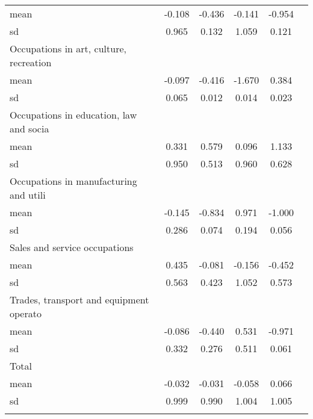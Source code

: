 \begin{tabular*}{\hsize}{ @{\extracolsep{\fill}}l*{5}{c}}
mean                                              &-0.108&-0.436&-0.141&-0.954\\
sd                                                &0.965&0.132&1.059&0.121\\
\hspace{0.25cm}Occupations in art, culture, recreation           &    &    &    &    \\
mean                                              &-0.097&-0.416&-1.670&0.384\\
sd                                                &0.065&0.012&0.014&0.023\\
\hspace{0.25cm}Occupations in education, law and socia           &    &    &    &    \\
mean                                              &0.331&0.579&0.096&1.133\\
sd                                                &0.950&0.513&0.960&0.628\\
\hspace{0.25cm}Occupations in manufacturing and utili            &    &    &    &    \\
mean                                              &-0.145&-0.834&0.971&-1.000\\
sd                                                &0.286&0.074&0.194&0.056\\
\hspace{0.25cm}Sales and service occupations                     &    &    &    &    \\
mean                                              &0.435&-0.081&-0.156&-0.452\\
sd                                                &0.563&0.423&1.052&0.573\\
\hspace{0.25cm}Trades, transport and equipment operato           &    &    &    &    \\
mean                                              &-0.086&-0.440&0.531&-0.971\\
sd                                                &0.332&0.276&0.511&0.061\\
\hspace{0.25cm}Total                                             &    &    &    &    \\
mean                                              &-0.032&-0.031&-0.058&0.066\\
sd                                                &0.999&0.990&1.004&1.005\\
\\
\hline \hline
\end{tabular*}
